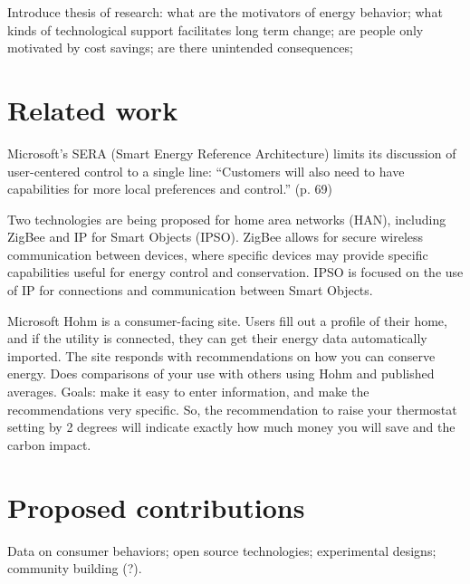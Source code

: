 Introduce thesis of research: what are the motivators of energy behavior;
what kinds of technological support facilitates long term change; are
people only motivated by cost savings; are there unintended consequences;




\section{Related work}

Microsoft's SERA (Smart Energy Reference Architecture) limits its
discussion of user-centered control to a single line: ``Customers will also
need to have capabilities for more local preferences and control.''
(p. 69)

Two technologies are being proposed for home area networks (HAN), including ZigBee and IP for Smart Objects (IPSO).
ZigBee allows for secure wireless communication between devices, where specific devices may provide specific capabilities useful for energy control and conservation.
IPSO is focused on the use of IP for connections and communication between Smart Objects.


Microsoft Hohm is a consumer-facing site.  Users fill out a profile of
their home, and if the utility is connected, they can get their energy data
automatically imported.  The site responds with recommendations on how you
can conserve energy. Does comparisons of your use with others using Hohm
and
published averages.   Goals: make it easy to enter information, and make
the recommendations very specific.  So, the recommendation to raise your
thermostat setting by 2 degrees will indicate exactly how much money you
will save and the carbon impact.


\section{Proposed contributions}

Data on consumer behaviors; open source technologies; experimental designs;
community building (?).


 











